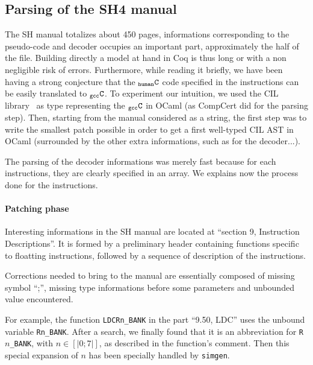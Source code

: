 \documentclass[a4paper, 11pt]{article}
\newcommand{\simgen}{{\tt simgen}\xspace}
\newcommand{\gccC}{$_{\tt gcc}{\tt C}$\xspace}
\newcommand{\hC}{$_{\tt human}{\tt C}$\xspace}
\begin{document}
  \subsection{Parsing of the SH4 manual}
The SH manual totalizes about 450 pages, informations corresponding to the pseudo-code and decoder occupies an important part, approximately the half of the file. Building directly a model at hand in Coq is thus long or with a non negligible risk of errors. 
Furthermore, while reading it briefly, we have been having a strong conjecture that the \hC code specified in the instructions can be easily translated to \gccC. To experiment our intuition, we used the CIL library~\cite{necula} as type representing the \gccC in OCaml (as CompCert did for the parsing step). Then, starting from the manual considered as a string, the first step was to write the smallest patch possible in order to get a first well-typed CIL AST in OCaml (surrounded by the other extra informations, such as for the decoder...).

The parsing of the decoder informations was merely fast because for each instructions, they are clearly specified in an array. We explains now the process done for the instructions.

\paragraph{Patching phase}

Interesting informations in the SH manual are located at ``section 9, Instruction Descriptions''. It is formed by a preliminary header containing functions specific to floatting instructions, followed by a sequence of description of the instructions. 

Corrections needed to bring to the manual are essentially composed of missing symbol ``;'', missing type informations before some parameters and unbounded value encountered. 

For example, the function \verb|LDCRn_BANK| in the part ``9.50, LDC'' uses the unbound variable \verb|Rn_BANK|.  After a search, we finally found that it is an abbreviation for \verb|R|$n$\verb|_BANK|, with $n \in [|0;7|]$, as described in the function's comment. Then this special expansion of $n$ has been specially handled by \simgen.
\end{document}
